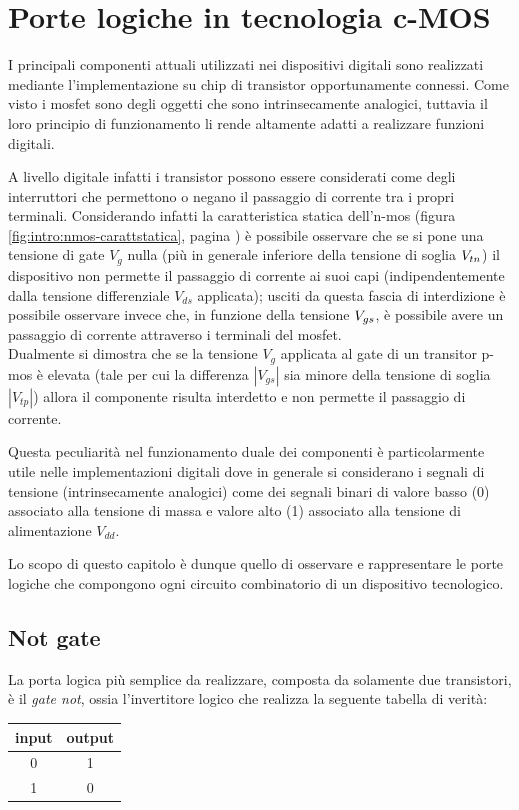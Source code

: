 \chapter{Porte logiche in tecnologia c-MOS}
	
	I principali componenti attuali utilizzati nei dispositivi digitali sono realizzati mediante l'implementazione su chip di transistor opportunamente connessi. Come visto i mosfet sono degli oggetti che sono intrinsecamente analogici, tuttavia il loro principio di funzionamento li rende altamente adatti a realizzare funzioni digitali.
	
	A livello digitale infatti i transistor possono essere considerati come degli interruttori che permettono o negano il passaggio di corrente tra i propri terminali. Considerando infatti la caratteristica statica dell'n-mos (figura \ref{fig:intro:nmos-carattstatica}, pagina \pageref{fig:intro:nmos-carattstatica}) è possibile osservare che se si pone una tensione di gate $V_g$ nulla (più in generale inferiore della tensione di soglia $V_{tn}$) il dispositivo non permette il passaggio di corrente ai suoi capi (indipendentemente dalla tensione differenziale $V_{ds}$ applicata); usciti da questa fascia di interdizione è possibile osservare invece che, in funzione della tensione $V_{gs}$, è possibile avere un passaggio di corrente attraverso i terminali del mosfet.\\
	Dualmente si dimostra che se la tensione $V_g$ applicata al gate di un transitor p-mos è elevata (tale per cui la differenza $|V_{gs}|$ sia minore della tensione di soglia $|V_{tp}|$) allora il componente risulta interdetto e non permette il passaggio di corrente.
	
	Questa peculiarità nel funzionamento duale dei componenti è particolarmente utile nelle implementazioni digitali dove in generale si considerano i segnali di tensione (intrinsecamente analogici) come dei segnali binari di valore basso (0) associato alla tensione di massa e valore alto (1) associato alla tensione di alimentazione $V_{dd}$.
	
	Lo scopo di questo capitolo è dunque quello di osservare e rappresentare le porte logiche che compongono ogni circuito combinatorio di un dispositivo tecnologico.

\section{Not gate}
	
	La porta logica più semplice da realizzare, composta da solamente due transistori, è il \textit{gate not}, ossia l'invertitore logico che realizza la seguente tabella di verità:
	\begin{center}
	\begin{tabular}{c | c}
			input & output \\ \hline
			0 & 1 \\ 1 & 0
	\end{tabular}
	\end{center}
	
